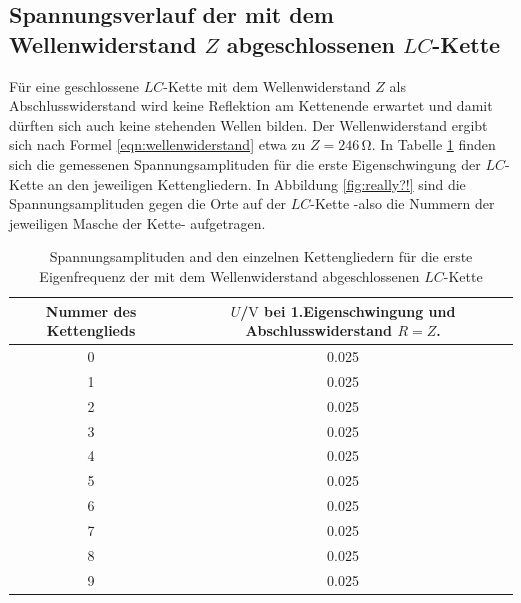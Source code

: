 \subsection{Spannungsverlauf der mit dem Wellenwiderstand $Z$ abgeschlossenen $LC$-Kette}
Für eine geschlossene $LC$-Kette mit dem Wellenwiderstand $Z$ als Abschlusswiderstand wird keine Reflektion am Kettenende erwartet und damit dürften sich auch keine stehenden Wellen bilden.
Der Wellenwiderstand ergibt sich nach Formel \eqref{eqn:wellenwiderstand} etwa zu $Z=246 \,\si{\ohm}$.
In Tabelle \ref{tab:lame} finden sich die gemessenen Spannungsamplituden für die erste Eigenschwingung der $LC$-Kette an den jeweiligen Kettengliedern.
In Abbildung \ref{fig:really?!} sind die Spannungsamplituden gegen die Orte auf der $LC$-Kette -also die Nummern der jeweiligen Masche der Kette- aufgetragen.
\begin{table}
	\centering
	\caption{Spannungsamplituden and den einzelnen Kettengliedern für die erste Eigenfrequenz der mit dem Wellenwiderstand abgeschlossenen $LC$-Kette}
	\label{tab:lame}
	\begin{tabular}{cc}
		\toprule
		Nummer des Kettenglieds & $U$/$\si{\volt}$ bei 1.Eigenschwingung und Abschlusswiderstand $R=Z$. \\
		\midrule
		0                       & 0.025                                                                 \\
		1                       & 0.025                                                                 \\
		2                       & 0.025                                                                 \\
		3                       & 0.025                                                                 \\
		4                       & 0.025                                                                 \\
		5                       & 0.025                                                                 \\
		6                       & 0.025                                                                 \\
		7                       & 0.025                                                                 \\
		8                       & 0.025                                                                 \\
		9                       & 0.025                                                                 \\

\end{tabular}
\end{table}
